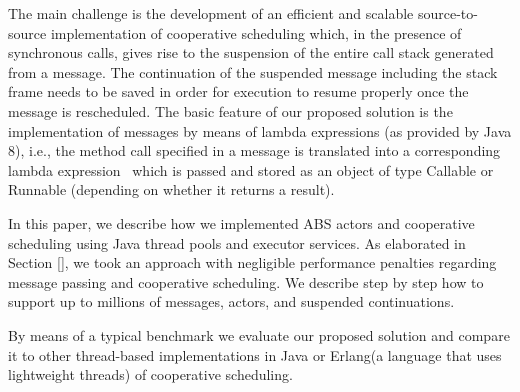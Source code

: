 The main challenge is the development of an efficient and scalable source-to-source implementation of cooperative scheduling which, in the presence of synchronous calls, gives rise to the suspension of the entire call stack generated from a message.
The continuation of the suspended message including the stack frame needs to be saved in order for execution to resume properly once the message is rescheduled.
The basic feature of our proposed solution is the implementation of messages by means of lambda expressions (as provided by Java 8), i.e., the method call specified in a message
is translated into a corresponding lambda expression~\cite{lambdas} which is passed and stored as
an object of type Callable or Runnable (depending on whether it returns a result). 

In this paper, we describe how we implemented ABS actors and cooperative scheduling using Java thread pools and executor services.  
As elaborated in Section \ref{}, we took an approach with negligible performance penalties regarding message passing and cooperative scheduling. 
We describe step by step how to support up to millions of messages,  actors, and suspended continuations.


By means of a typical benchmark we evaluate our proposed solution and compare it
to other thread-based implementations in Java or Erlang(a language that uses lightweight threads) of cooperative scheduling.


